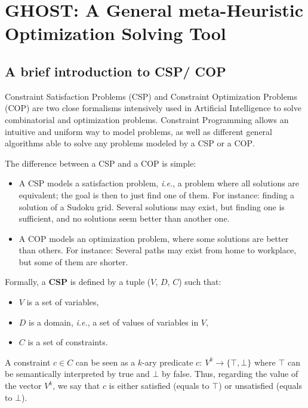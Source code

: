 \documentclass[journal]{IEEEtran}
\newcommand{\csp}{\textsc{CSP}\xspace}
\newcommand{\cop}{\textsc{COP}\xspace}
\newcommand{\ghost}{\textsc{GHOST}\xspace}
\newcommand{\ie}{\textit{i.e.}}
\begin{document}
\section{\ghost:   A  General   meta-Heuristic  Optimization   Solving
  Tool}\label{sec:ghost}
\subsection{A brief introduction to \csp / \cop}

Constraint  Satisfaction Problems  (\csp) and  Constraint Optimization
Problems  (\cop)   are  two  close  formalisms   intensively  used  in
Artificial  Intelligence  to   solve  combinatorial  and  optimization
problems. Constraint  Programming allows an intuitive  and uniform way
to model  problems, as  well as different  general algorithms  able to
solve any problems modeled by a \csp or a \cop.

The difference between a \csp and a \cop is simple:

\begin{itemize}
\item A \csp  models a satisfaction problem, \ie, a  problem where all
  solutions  are equivalent;  the goal  is then  to just  find one  of
  them. For  instance: finding  a solution of  a Sudoku  grid. Several
  solutions may exist, but finding one is sufficient, and no solutions
  seem better than another one.
\item A \cop models an  optimization problem, where some solutions are
  better than others.  For instance: Several paths may exist from home
  to workplace, but some of them are shorter.
\end{itemize}

Formally, a {\bf \csp} is defined by a tuple ($V$, $D$, $C$) such that:
\begin{itemize}
\item $V$ is a set of variables,
\item $D$ is a domain, \ie, a set of values of variables in $V$,
\item $C$ is a set of constraints.
\end{itemize}

A  constraint  $c   \in  C$  can  be  seen  as   a  $k$-ary  predicate
$c:~V^k\rightarrow\{\top,\bot\}$ where $\top$ can be semantically
interpreted by true and $\bot$ by  false. Thus, regarding the value of
the  vector $V^k$,  we say  that $c$  is either  satisfied (equals  to
$\top$) or unsatisfied (equals to $\bot$).
\end{document}
